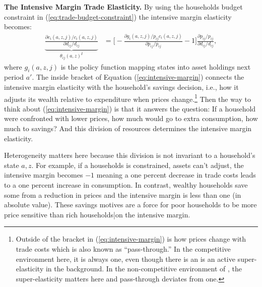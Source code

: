 \documentclass[12pt,pdftex]{article}
\begin{document}
\begin{onehalfspacing}
\textbf{The Intensive Margin Trade Elasticity.} By using the households budget constraint in (\ref{eq:trade-budget-constraint}) the intensive margin elasticity becomes:
\begin{align}
\underbrace{\frac{\partial c_{i}(a,z,j)/ c_{i}(a,z,j)}{\partial d_{ij} / d_{ij}}}_{\theta_{ij}(a,z)^{I}} &= \bigg [-\frac{\partial g_{i}(a,z,j)/ p_{ij}c_{i}(a,z,j)}{\partial p_{ij}/ p_{ij}} - 1 \bigg ]\frac{\partial p_{ij}/p_{ij}}{\partial d_{ij}/ d_{ij}} ,
\label{eq:intensive-margin}
\end{align}
where $g_{i}(a,z,j)$ is the policy function mapping states into asset holdings next period $a'$. The inside bracket of Equation (\ref{eq:intensive-margin}) connects the intensive margin elasticity with the household's savings decision, i.e., how it adjusts its wealth relative to expenditure when prices change.\footnote{Outside of the bracket in (\ref{eq:intensive-margin}) is how prices change with trade costs which is also known as ``pass-through.'' In the competitive environment here, it is always one, even though there is an is an active super-elasticity in the background. In the non-competitive environment of \citet{p-iq}, the super-elasticity matters here and pass-through deviates from one.} Then the way to think about (\ref{eq:intensive-margin}) is that it answers the question: If a household were confronted with lower prices, how much would go to extra consumption, how much to savings? And this division of resources determines the intensive margin elasticity.

Heterogeneity matters here because this division is not invariant to a household's state $a, z$. For example, if a households is constrained, assets can't adjust, the intensive margin becomes $-1$ meaning a one percent decrease in trade costs leads to a one percent increase in consumption. In contrast, wealthy households save some from a reduction in prices and the intensive margin is less than one (in absolute value). These savings motives are a force for poor households to be more price sensitive than rich households|on the intensive margin.


\end{onehalfspacing}
\end{document}
